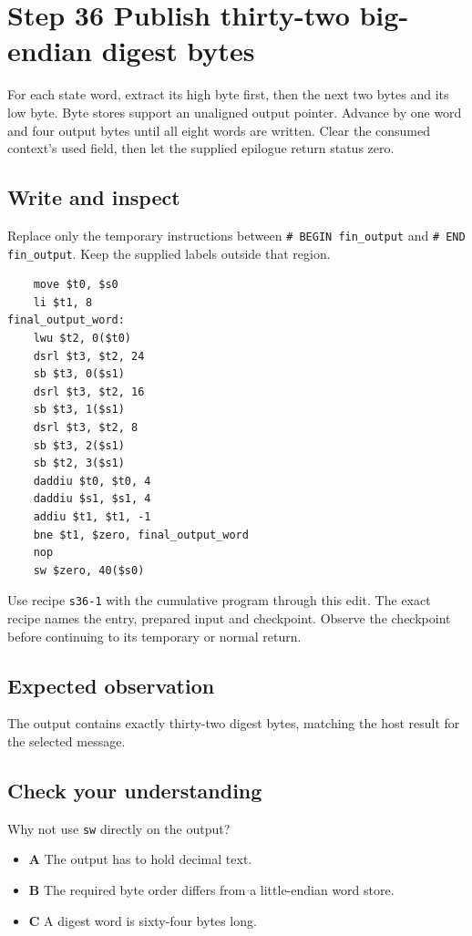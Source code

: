 \section{Step 36 Publish thirty-two big-endian digest bytes}\label{sha-s36}

For each state word, extract its high byte first, then the next two bytes and its low byte. Byte stores support an unaligned output pointer. Advance by one word and four output bytes until all eight words are written. Clear the consumed context's used field, then let the supplied epilogue return status zero.

\subsection{Write and inspect}
Replace only the temporary instructions between \texttt{\# BEGIN fin\_output} and \texttt{\# END fin\_output}. Keep the supplied labels outside that region.

\begin{verbatim}
    move $t0, $s0
    li $t1, 8
final_output_word:
    lwu $t2, 0($t0)
    dsrl $t3, $t2, 24
    sb $t3, 0($s1)
    dsrl $t3, $t2, 16
    sb $t3, 1($s1)
    dsrl $t3, $t2, 8
    sb $t3, 2($s1)
    sb $t2, 3($s1)
    daddiu $t0, $t0, 4
    daddiu $s1, $s1, 4
    addiu $t1, $t1, -1
    bne $t1, $zero, final_output_word
    nop
    sw $zero, 40($s0)
\end{verbatim}

Use recipe \texttt{s36-1} with the cumulative program through this edit. The exact recipe names the entry, prepared input and checkpoint. Observe the checkpoint before continuing to its temporary or normal return.

\subsection{Expected observation}
The output contains exactly thirty-two digest bytes, matching the host result for the selected message.

\subsection{Check your understanding}
Why not use \texttt{sw} directly on the output?

\begin{itemize}
\item \textbf{A} The output has to hold decimal text.
\item \textbf{B} The required byte order differs from a little-endian word store.
\item \textbf{C} A digest word is sixty-four bytes long.
\end{itemize}
